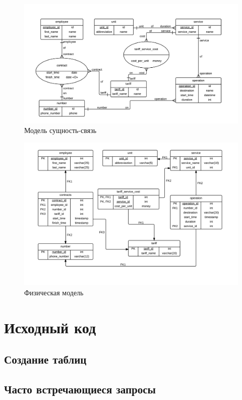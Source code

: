 \documentclass[10pt, a4paper]{article}
\begin{document}
\begin{figure}[H]
	\centering
	\includegraphics[scale=0.2]{erm}
	\caption{Модель сущность-связь}
	\label{fig:erm}
\end{figure}

\begin{figure}[H]
	\centering
	\includegraphics[scale=0.2]{pdm}
	\caption{Физическая модель}
	\label{fig:pdm}
\end{figure}

\section{Исходный код}
\subsection{Создание таблиц}

\begin{sql}

\end{sql}

\subsection{Часто встречающиеся запросы}

\begin{sql}

\end{sql}
\end{document}

